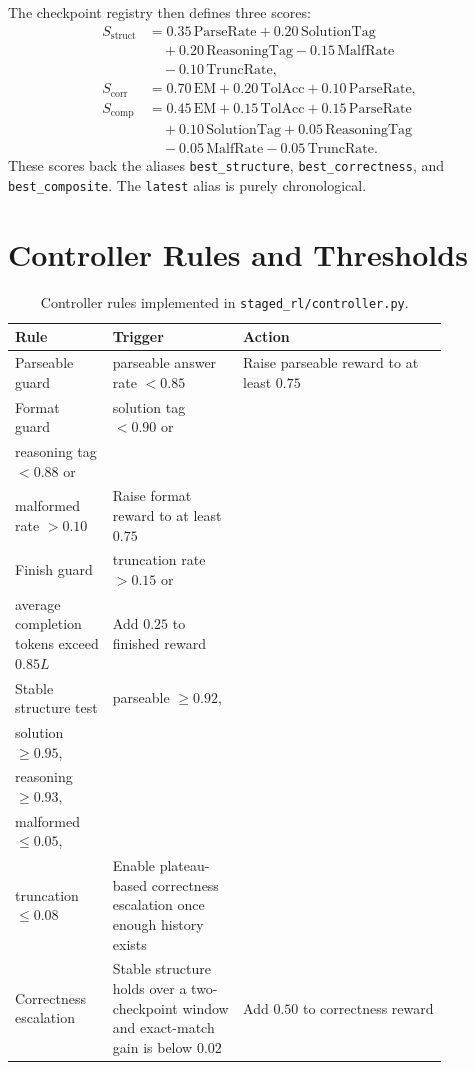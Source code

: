 \documentclass{article} %
\begin{document}
The checkpoint registry then defines three scores:
\begin{align}
S_{\mathrm{struct}} &= 0.35\,\mathrm{ParseRate} + 0.20\,\mathrm{SolutionTag} \nonumber\\
&\quad + 0.20\,\mathrm{ReasoningTag} - 0.15\,\mathrm{MalfRate} \nonumber\\
&\quad - 0.10\,\mathrm{TruncRate},\\
S_{\mathrm{corr}} &= 0.70\,\mathrm{EM} + 0.20\,\mathrm{TolAcc} + 0.10\,\mathrm{ParseRate},\\
S_{\mathrm{comp}} &= 0.45\,\mathrm{EM} + 0.15\,\mathrm{TolAcc} + 0.15\,\mathrm{ParseRate} \nonumber\\
&\quad + 0.10\,\mathrm{SolutionTag} + 0.05\,\mathrm{ReasoningTag} \nonumber\\
&\quad - 0.05\,\mathrm{MalfRate} - 0.05\,\mathrm{TruncRate}.
\end{align}
These scores back the aliases \texttt{best\_structure}, \texttt{best\_correctness}, and \texttt{best\_composite}. The \texttt{latest} alias is purely chronological.

\section{Controller Rules and Thresholds}

\begin{table}[t]
\centering
\small
\caption{Controller rules implemented in \texttt{staged\_rl/controller.py}.}
\label{tab:controller-rules}
\begin{tabular}{L{0.19\linewidth} L{0.26\linewidth} L{0.41\linewidth}}
\toprule
Rule & Trigger & Action \\
\midrule
Parseable guard & parseable answer rate $< 0.85$ & Raise parseable reward to at least $0.75$ \\
Format guard & solution tag $< 0.90$ or\\ reasoning tag $< 0.88$ or\\ malformed rate $> 0.10$ & Raise format reward to at least $0.75$ \\
Finish guard & truncation rate $> 0.15$ or\\ average completion tokens exceed $0.85L$ & Add $0.25$ to finished reward \\
Stable structure test & parseable $\ge 0.92$,\\ solution $\ge 0.95$,\\ reasoning $\ge 0.93$,\\ malformed $\le 0.05$,\\ truncation $\le 0.08$ & Enable plateau-based correctness escalation once enough history exists \\
Correctness escalation & Stable structure holds over a two-checkpoint window and exact-match gain is below $0.02$ & Add $0.50$ to correctness reward \\
\bottomrule
\end{tabular}
\end{table}
\end{document}
